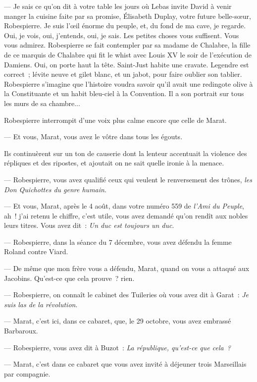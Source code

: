 \documentclass[french,twoside]{book} %
\begin{document}
— Je sais ce qu’on dit à votre table les jours où Lebas invite David à venir manger la cuisine faite par sa promise, Élisabeth Duplay, votre future belle-sœur, Robespierre. Je suis l’œil énorme du peuple, et, du fond de ma cave, je regarde. Oui, je vois, oui, j’entends, oui, je sais. Les petites choses vous suffisent. Vous vous admirez. Robespierre se fait contempler par sa madame de Chalabre, la fille de ce marquis de Chalabre qui fit le whist avec Louis XV le soir de l’exécution de Damiens. Oui, on porte haut la tête. Saint-Just habite une cravate. Legendre est correct ; lévite neuve et gilet blanc, et un jabot, pour faire oublier son tablier. Robespierre s’imagine que l’histoire voudra savoir qu’il avait une redingote olive à la Constituante et un habit bleu-ciel à la Convention. Il a son portrait sur tous les murs de sa chambre...\par
Robespierre interrompit d’une voix plus calme encore que celle de Marat.\par
— Et vous, Marat, vous avez le vôtre dans tous les égouts.\par
Ils continuèrent sur un ton de causerie dont la lenteur accentuait la violence des répliques et des ripostes, et ajoutait on ne sait quelle ironie à la menace.\par
— Robespierre, vous avez qualifié ceux qui veulent le renversement des trônes, \emph{les Don Quichottes du genre humain}.\par
 — Et vous, Marat, après le 4 août, dans votre numéro 559 de \emph{l’Ami du Peuple}, ah ! j’ai retenu le chiffre, c’est utile, vous avez demandé qu’on rendît aux nobles leurs titres. Vous avez dit : \emph{Un duc est toujours un duc}.\par
— Robespierre, dans la séance du 7 décembre, vous avez défendu la femme Roland contre Viard.\par
— De même que mon frère vous a défendu, Marat, quand on vous a attaqué aux Jacobins. Qu’est-ce que cela prouve ? rien.\par
— Robespierre, on connaît le cabinet des Tuileries où vous avez dit à Garat : \emph{Je suis las de la révolution}.\par
— Marat, c’est ici, dans ce cabaret, que, le 29 octobre, vous avez embrassé Barbaroux.\par
— Robespierre, vous avez dit à Buzot : \emph{La république, qu’est-ce que cela ?}\par
— Marat, c’est dans ce cabaret que vous avez invité à déjeuner trois Marseillais par compagnie.\par
\end{document}
